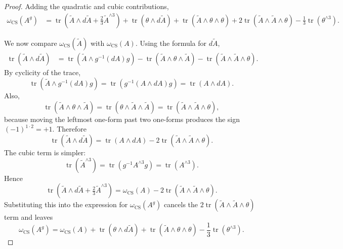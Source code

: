 \documentclass[11pt]{article}
\newcommand{\tr}{\operatorname{tr}}
\newcommand{\CS}{\operatorname{CS}}
\theoremstyle{definition}
\numberwithin{theorem}{section}
\numberwithin{equation}{section}
\begin{document}
\begin{proof}
\medskip

\noindent Adding the quadratic and cubic contributions,
\begin{align*}
\omega_{\CS}(A^g)
&= \tr(\tilde A\wedge d\tilde A + \tfrac{2}{3}\tilde A^{\wedge 3})
 + \tr(\theta\wedge d\tilde A)
 + \tr(\tilde A\wedge\theta\wedge\theta)
 + 2\tr(\tilde A\wedge\tilde A\wedge\theta)
 - \frac{1}{3}\tr(\theta^{\wedge 3}).
\end{align*}

\medskip

\noindent We now compare $\omega_{\CS}(\tilde A)$ with $\omega_{\CS}(A)$. Using the formula for $d\tilde A$,
\begin{align*}
\tr(\tilde A\wedge d\tilde A)
&= \tr\left(\tilde A\wedge g^{-1}(dA)g\right)
 - \tr(\tilde A\wedge\theta\wedge\tilde A)
 - \tr(\tilde A\wedge\tilde A\wedge\theta).
\end{align*}
By cyclicity of the trace,
\begin{equation*}
\tr\left(\tilde A\wedge g^{-1}(dA)g\right)
= \tr\left(g^{-1}(A\wedge dA)g\right)
= \tr(A\wedge dA).
\end{equation*}
Also,
\begin{equation*}
\tr(\tilde A\wedge\theta\wedge\tilde A)
= \tr(\theta\wedge\tilde A\wedge\tilde A)
= \tr(\tilde A\wedge\tilde A\wedge\theta),
\end{equation*}
because moving the leftmost one-form past two one-forms produces the sign $(-1)^{1\cdot 2}=+1$. Therefore
\begin{equation*}
\tr(\tilde A\wedge d\tilde A)
= \tr(A\wedge dA) - 2\tr(\tilde A\wedge\tilde A\wedge\theta).
\end{equation*}
The cubic term is simpler:
\begin{equation*}
\tr(\tilde A^{\wedge 3})
= \tr\left(g^{-1}A^{\wedge 3}g\right)
= \tr(A^{\wedge 3}).
\end{equation*}
Hence
\begin{equation*}
\tr(\tilde A\wedge d\tilde A + \tfrac{2}{3}\tilde A^{\wedge 3})
= \omega_{\CS}(A) - 2\tr(\tilde A\wedge\tilde A\wedge\theta).
\end{equation*}
Substituting this into the expression for $\omega_{\CS}(A^g)$ cancels the $2\tr(\tilde A\wedge\tilde A\wedge\theta)$ term and leaves
\begin{equation*}
\omega_{\CS}(A^g)
= \omega_{\CS}(A)
 + \tr(\theta\wedge d\tilde A)
 + \tr(\tilde A\wedge\theta\wedge\theta)
 - \frac{1}{3}\tr(\theta^{\wedge 3}).
\end{equation*}


\end{proof}
\end{document}
